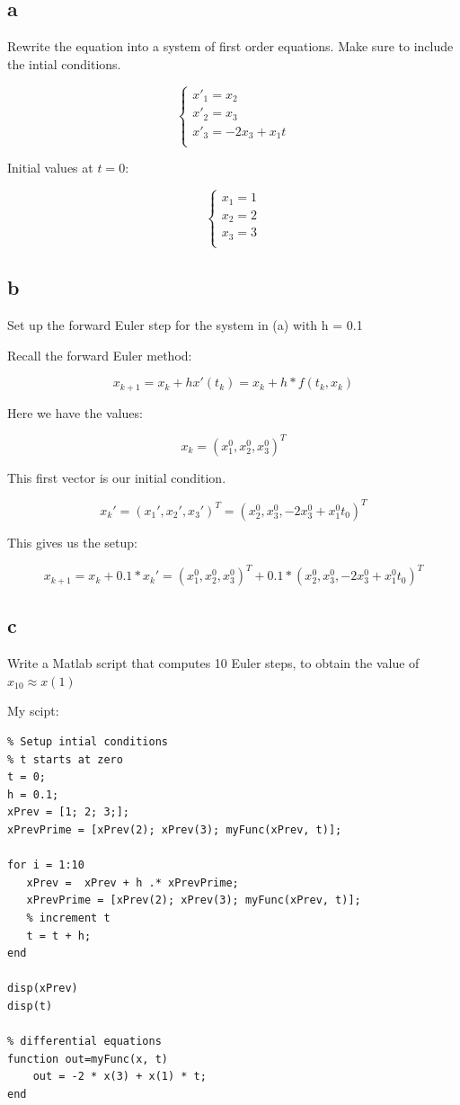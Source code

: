 \documentclass[]{article}
\begin{document}
\subsection{a}\label{a}

Rewrite the equation into a system of first order equations. Make sure
to include the intial conditions.

\[
\begin{cases} 
      x'_1 = x_2 \\
      x'_2 = x_3 \\
      x'_3 = -2x_3 + x_1t\\  
\end{cases}
\]

Initial values at \(t = 0\):

\[
\begin{cases} 
      x_1 = 1 \\
      x_2 = 2 \\
      x_3 = 3 \\
\end{cases}
\]

\subsection{b}\label{b}

Set up the forward Euler step for the system in (a) with h = 0.1

Recall the forward Euler method:

\[x_{k+1} = x_k + hx'(t_k) = x_k + h*f(t_k,x_k)\]

Here we have the values:

\[x_k = (x_1^0, x_2^0, x_3^0)^T\]

This first vector is our initial condition.

\[x_k' = (x_1', x_2',x_3')^T = (x_2^0, x_3^0, -2x_3^0+x_1^0t_0)^T\]

This gives us the setup:

\[x_{k+1} = x_k + 0.1 * x_k' = (x_1^0, x_2^0, x_3^0)^T + 0.1 * (x_2^0, x_3^0, -2x_3^0+x_1^0t_0)^T\]

\subsection{c}\label{c-1}

Write a Matlab script that computes 10 Euler steps, to obtain the value
of \(x_10 \approx x(1)\)

My scipt:

\begin{verbatim}
% Setup intial conditions
% t starts at zero
t = 0;
h = 0.1;
xPrev = [1; 2; 3;];
xPrevPrime = [xPrev(2); xPrev(3); myFunc(xPrev, t)];

for i = 1:10
   xPrev =  xPrev + h .* xPrevPrime;
   xPrevPrime = [xPrev(2); xPrev(3); myFunc(xPrev, t)];
   % increment t
   t = t + h;
end

disp(xPrev)
disp(t)

% differential equations
function out=myFunc(x, t) 
    out = -2 * x(3) + x(1) * t;
end
\end{verbatim}
\end{document}
